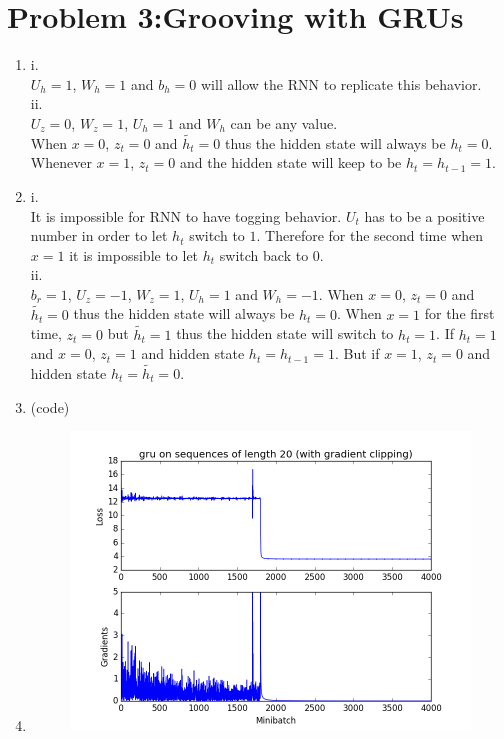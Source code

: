 \documentclass[10pt]{article}
\begin{document}
\section*{Problem 3:Grooving with GRUs}
\begin{enumerate}[label=(\alph*)]
\item
i.\\
$U_h = 1$, $W_h = 1$ and $b_h = 0$ will allow the RNN to replicate this behavior.\\

ii.\\
$U_z = 0$, $W_z = 1$, $U_h = 1$ and $W_h$ can be any value.\\
When $x=0$, $z_t = 0$ and $\tilde{h_t} = 0$ thus the hidden state will always be $h_t = 0$.
Whenever $x=1$, $z_t = 0$ and the hidden state will keep to be $h_t = h_{t-1} = 1$.

\item
i.\\
It is impossible for RNN to have togging behavior.
$U_t$ has to be a positive number in order to let $h_t$ switch to $1$.
Therefore for the second time when $x = 1$ it is impossible to let $h_t$ switch back to $0$.\\

ii.\\
$b_r = 1$, $U_z = -1$, $W_z = 1$, $U_h = 1$ and $W_h = -1$.
When $x=0$, $z_t = 0$ and $\tilde{h_t} = 0$ thus the hidden state will always be $h_t = 0$.
When $x=1$ for the first time, $z_t = 0$ but $\tilde{h_t} = 1$ thus the hidden state will switch to $h_t = 1$.
If $h_t=1$ and $x=0$, $z_t = 1$ and hidden state $h_t = h_{t-1} = 1$.
But if $x=1$, $z_t = 0$ and hidden state $h_t = \tilde{h_t} = 0$.

\item
(code)

\item
\begin{figure}[h]
\center
\includegraphics[scale=0.45]{q3-clip-gru.png}
\end{figure}


\end{enumerate}
\end{document}
